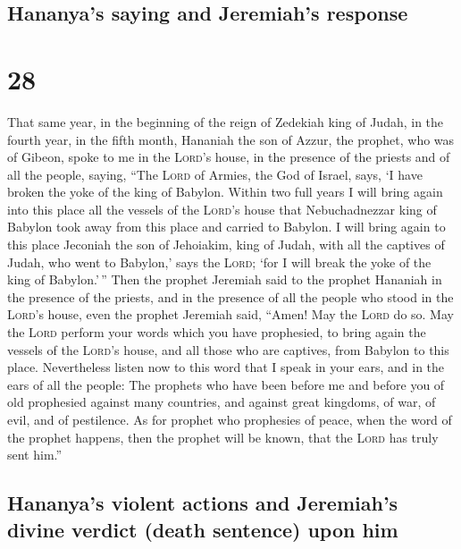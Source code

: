 \hypertarget{hananyas-saying-and-jeremiahs-response}{%
\subsection{Hananya's saying and Jeremiah's
response}\label{hananyas-saying-and-jeremiahs-response}}

\hypertarget{section-27}{%
\section{28}\label{section-27}}

 That same year, in the beginning of the reign of Zedekiah
king of Judah, in the fourth year, in the fifth month, Hananiah the son
of Azzur, the prophet, who was of Gibeon, spoke to me in the
\textsc{Lord}'s house, in the presence of the priests and of all the
people, saying,  ``The \textsc{Lord} of Armies, the God of
Israel, says, `I have broken the yoke of the king of Babylon.
 Within two full years I will bring again into this place
all the vessels of the \textsc{Lord}'s house that Nebuchadnezzar king of
Babylon took away from this place and carried to Babylon. 
I will bring again to this place Jeconiah the son of Jehoiakim, king of
Judah, with all the captives of Judah, who went to Babylon,' says the
\textsc{Lord}; `for I will break the yoke of the king of Babylon.'\,''
 Then the prophet Jeremiah said to the prophet Hananiah in
the presence of the priests, and in the presence of all the people who
stood in the \textsc{Lord}'s house,  even the prophet
Jeremiah said, ``Amen! May the \textsc{Lord} do so. May the
\textsc{Lord} perform your words which you have prophesied, to bring
again the vessels of the \textsc{Lord}'s house, and all those who are
captives, from Babylon to this place.  Nevertheless listen
now to this word that I speak in your ears, and in the ears of all the
people:  The prophets who have been before me and before
you of old prophesied against many countries, and against great
kingdoms, of war, of evil, and of pestilence.  As for
prophet who prophesies of peace, when the word of the prophet happens,
then the prophet will be known, that the \textsc{Lord} has truly sent
him.''

\hypertarget{hananyas-violent-actions-and-jeremiahs-divine-verdict-death-sentence-upon-him}{%
\subsection{Hananya's violent actions and Jeremiah's divine verdict
(death sentence) upon
him}\label{hananyas-violent-actions-and-jeremiahs-divine-verdict-death-sentence-upon-him}}

